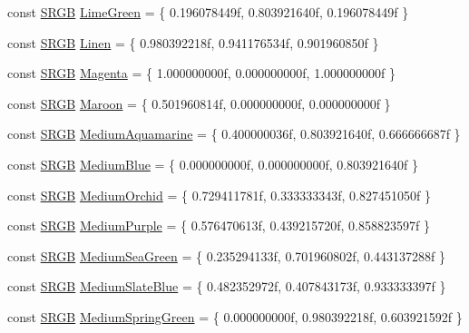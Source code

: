 \begin{DoxyCompactItemize}
\item 
const \hyperlink{structmage_1_1_s_r_g_b}{S\+R\+GB} \hyperlink{namespacemage_1_1color_a7893ab9037dfc5ee563b46475ce636d1}{Lime\+Green} = \{ 0.\+196078449f, 0.\+803921640f, 0.\+196078449f \}
\item 
const \hyperlink{structmage_1_1_s_r_g_b}{S\+R\+GB} \hyperlink{namespacemage_1_1color_a3804411acfe7c2e8567f61ebe7f40522}{Linen} = \{ 0.\+980392218f, 0.\+941176534f, 0.\+901960850f \}
\item 
const \hyperlink{structmage_1_1_s_r_g_b}{S\+R\+GB} \hyperlink{namespacemage_1_1color_af421aa7734e092e59d0bab49ea55e507}{Magenta} = \{ 1.\+000000000f, 0.\+000000000f, 1.\+000000000f \}
\item 
const \hyperlink{structmage_1_1_s_r_g_b}{S\+R\+GB} \hyperlink{namespacemage_1_1color_ad8905eb70dd62d46ffdbb2ff95950b49}{Maroon} = \{ 0.\+501960814f, 0.\+000000000f, 0.\+000000000f \}
\item 
const \hyperlink{structmage_1_1_s_r_g_b}{S\+R\+GB} \hyperlink{namespacemage_1_1color_a0fb4af052581f1f5ec11f55c8f34a358}{Medium\+Aquamarine} = \{ 0.\+400000036f, 0.\+803921640f, 0.\+666666687f \}
\item 
const \hyperlink{structmage_1_1_s_r_g_b}{S\+R\+GB} \hyperlink{namespacemage_1_1color_a25277573a2c7954ecdf46e37aac44a02}{Medium\+Blue} = \{ 0.\+000000000f, 0.\+000000000f, 0.\+803921640f \}
\item 
const \hyperlink{structmage_1_1_s_r_g_b}{S\+R\+GB} \hyperlink{namespacemage_1_1color_a32f2d8a82097bf8d45397457656d1a9a}{Medium\+Orchid} = \{ 0.\+729411781f, 0.\+333333343f, 0.\+827451050f \}
\item 
const \hyperlink{structmage_1_1_s_r_g_b}{S\+R\+GB} \hyperlink{namespacemage_1_1color_a3733d64e3f1c7906847548ecefd66c8c}{Medium\+Purple} = \{ 0.\+576470613f, 0.\+439215720f, 0.\+858823597f \}
\item 
const \hyperlink{structmage_1_1_s_r_g_b}{S\+R\+GB} \hyperlink{namespacemage_1_1color_a819a1f60db591d9c96739cae2368c094}{Medium\+Sea\+Green} = \{ 0.\+235294133f, 0.\+701960802f, 0.\+443137288f \}
\item 
const \hyperlink{structmage_1_1_s_r_g_b}{S\+R\+GB} \hyperlink{namespacemage_1_1color_a3ad1f8f0b3443c934ace4e42485b5905}{Medium\+Slate\+Blue} = \{ 0.\+482352972f, 0.\+407843173f, 0.\+933333397f \}
\item 
const \hyperlink{structmage_1_1_s_r_g_b}{S\+R\+GB} \hyperlink{namespacemage_1_1color_a3c9aafece772659e6401c317487c1135}{Medium\+Spring\+Green} = \{ 0.\+000000000f, 0.\+980392218f, 0.\+603921592f \}

\end{DoxyCompactItemize}
